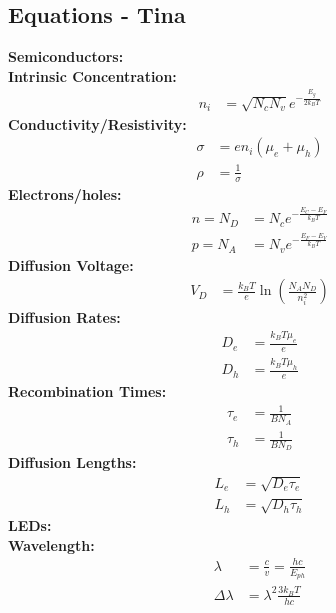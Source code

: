 \documentclass[landscape,a4paper,8pt]{article}
\begin{document}
\begin{multicols}{4}
	\section{Equations - Tina}
	\textbf{Semiconductors:}\\
	\hspace{3mm}\textbf{Intrinsic Concentration:}
	\begin{align}
		n_i &= \sqrt{N_c N_v} e^{-\frac{E_g}{2 k_B T}}
	\end{align}
	\hspace{3mm}\textbf{Conductivity/Resistivity:}
	\begin{align}
		\sigma &= e n_i (\mu_e + \mu_h)\\
		\rho &= \frac{1}{\sigma}
	\end{align}
	\hspace{3mm}\textbf{Electrons/holes:}
	\begin{align}
		n = N_D &= N_c e^{-\frac{E_C - E_F}{k_B T}}\\
		p = N_A &= N_v e^{-\frac{E_F - E_V}{k_B T}}
	\end{align}
	\hspace{3mm}\textbf{Diffusion Voltage:}
	\begin{align}
		V_D &= \frac{k_B T}{e} \ln \left( \frac{N_A N_D}{n_i^2} \right)
	\end{align}
	\hspace{3mm}\textbf{Diffusion Rates:}
	\begin{align}
		D_e &= \frac{k_B T \mu_e}{e}\\
		D_h &= \frac{k_B T \mu_h}{e}
	\end{align}
	\hspace{3mm}\textbf{Recombination Times:}
	\begin{align}
		\tau_e &= \frac{1}{B N_A}\\
		\tau_h &= \frac{1}{B N_D}
	\end{align}
	\hspace{3mm}\textbf{Diffusion Lengths:}
	\begin{align}
		L_e &= \sqrt{D_e \tau_e}\\
		L_h &= \sqrt{D_h \tau_h}
	\end{align}	
	\textbf{LEDs:}\\
	\hspace{3mm}\textbf{Wavelength:}
	\begin{align}
		\lambda &= \frac{c}{v} = \frac{hc}{E_{ph}}\\
		\Delta \lambda &= \lambda^2 \frac{3 k_B T}{hc}
	\end{align}

\end{multicols}
\end{document}

